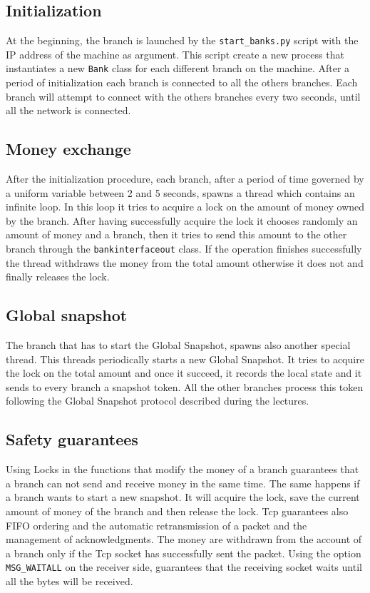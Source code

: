 \documentclass{article}
\begin{document}
        \subsection{Initialization}
        At the beginning, the branch is launched by the \texttt{start\_banks.py} script with the IP address of the machine as argument.
        This script create a new process that instantiates a new \texttt{Bank} class for each different branch on the machine.
        After a period of initialization each branch is connected to all the others branches.
        Each branch will attempt to connect with the others branches every two seconds, until all the network is connected.
        \subsection{Money exchange}
            After the initialization procedure, each branch, after a period of time governed by a uniform variable between 2 and 5 seconds, spawns a thread which contains an infinite loop. In this loop it tries to acquire a lock on the amount of money owned by the branch. After having successfully acquire the lock it chooses randomly an amount of money and a branch, then it tries to send this amount to the other branch through the \texttt{bankinterfaceout} class. If the operation finishes successfully the thread withdraws the money from the total amount otherwise it does not and finally releases the lock.\\
        \subsection{Global snapshot}
        The branch that has to start the Global Snapshot, spawns also another special thread. This threads periodically starts a new Global Snapshot. It tries to acquire the lock on the total amount and once it succeed, it records the local state and it sends to every branch a snapshot token. All the other branches process this token following the Global Snapshot protocol described during the lectures.\\
    \subsection{Safety guarantees}
        Using Locks in the functions that modify the money of a branch guarantees that a branch can not send and receive money in the same time. The same happens if a branch wants to start a new snapshot. It will acquire the lock, save the current amount of money of the branch and then release the lock.
        Tcp guarantees also FIFO ordering and the automatic retransmission of a packet and the management of acknowledgments. The money are withdrawn from the account of a branch only if the Tcp socket has successfully sent the packet.
        Using the option \texttt{MSG\_WAITALL} on the receiver side, guarantees that the receiving socket waits until all the bytes will be received.
\end{document}
